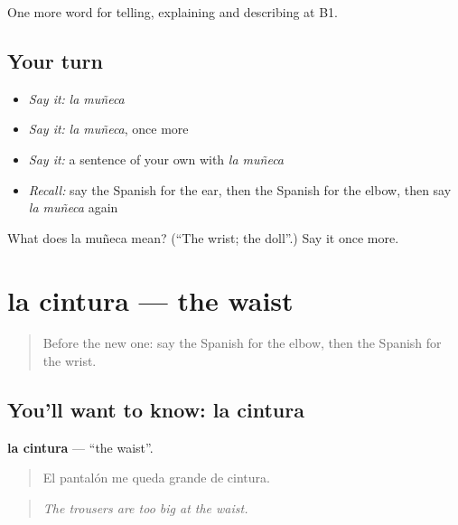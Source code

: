\begin{grammarlens}[title={What you've built}]
One more word for telling, explaining and describing at B1.
\end{grammarlens}

\subsection*{Your turn}
\begin{itemize}
\raggedright
  \item \emph{Say it:} \emph{la muñeca}
  \item \emph{Say it:} \emph{la muñeca}, once more
  \item \emph{Say it:} a sentence of your own with \emph{la muñeca}
  \item \emph{Recall:} say the Spanish for the ear, then the Spanish for the elbow, then say \emph{la muñeca} again
\end{itemize}

\begin{tcolorbox}[breakable,colback=teal!4,colframe=teal!35!black,title={Before you move on}]
What does la muñeca mean? (\textquotedblleft{}The wrist; the doll\textquotedblright{}.) Say it once more.
\end{tcolorbox}
\section[la cintura]{la cintura — the waist}

\label{lesson:ES-C737-cintura}



\begin{quote}
Before the new one: say the Spanish for the elbow, then the Spanish for the wrist.
\end{quote}

\subsection*{You'll want to know: la cintura}
\textbf{la cintura} — \textquotedblleft{}the waist\textquotedblright{}.

\begin{quote}
El pantalón me queda grande de cintura.
\end{quote}

\begin{quote}
\emph{The trousers are too big at the waist.}
\end{quote}

